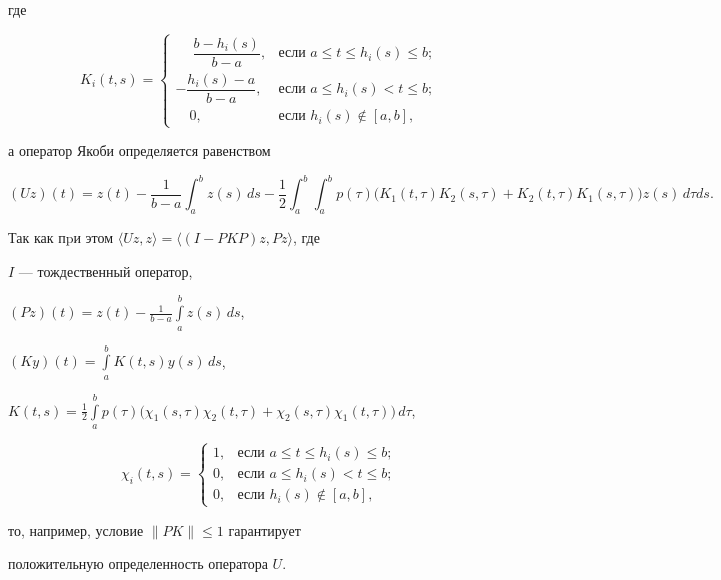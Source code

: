 где


$$


K_i(t,s)=


\begin{cases}


\phantom{-}\dfrac{b-h_i(s)}{b-a},&\text{если }a\le t\le h_i(s)\le b;\\


-\dfrac{h_i(s)-a}{b-a},&\text{если }a\le h_i(s)<t\le b;\\


\quad 0,&\text{если }h_i(s)\notin[a,b],


\end{cases}


$$


а оператор Якоби определяется равенством


$$


(Uz)(t)=z(t)-\frac{1}{b-a}\int_a^bz(s)\,ds-\frac12\int_a^b


\int_a^bp(\tau)\big(K_1(t,\tau)K_2(s,\tau)+


K_2(t,\tau)K_1(s,\tau)\big)z(s)\,d\tau ds.


$$


Так как пpи этом $\langle Uz,z\rangle=\langle(I-PKP)z,Pz\rangle$, где


$I$ --- тождественный оператор,


$(Pz)(t)=z(t)-\frac{1}{b-a}\int\limits_a^bz(s)\,ds$,


$(Ky)(t)=\int\limits_a^bK(t,s)y(s)\,ds$,


$K(t,s)=\frac{1}{2}\int\limits_a^bp(\tau)\big(\chi_1(s,\tau)\chi_2(t,\tau)+


\chi_2(s,\tau)\chi_1(t,\tau)\big)\,d\tau$,


$$


\chi_i(t,s)=\begin{cases}


1,&\text{если }a\le t\le h_i(s)\le b;\\


0,&\text{если }a\le h_i(s)<t\le b;\\


0,&\text{если }h_i(s)\notin[a,b],


\end{cases}


$$


то, например, условие $\|PK\|\le1$ гарантирует


положительную определенность оператора $U$.





